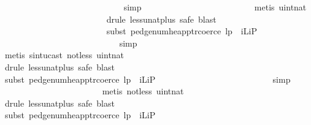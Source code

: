 \begin{isabellebody}
\ \ \ \ \ \ \ \ \ \ \ \ \ \ \ \ \ \ \ \ \ \ \ \ \ \ \ \isamarkupfalse%
\ simp{\isacharplus}\isanewline
\ \ \ \ \ \ \ \ \ \ \ \ \ \ \ \ \ \ \ \ \ \ \ \ \isamarkupfalse%
\ {\isacharparenleft}metis\ uint{\isacharunderscore}nat{\isacharparenright}\isanewline
\ \ \ \ \ \ \ \ \ \ \ \ \ \ \ \ \ \ \ \ \ \ \ \isamarkupfalse%
\ {\isacharparenleft}drule\ less{\isacharunderscore}unat{\isacharunderscore}plus{}{\isacharcomma}\ safe{\isacharcomma}\ blast{\isacharparenright}\isanewline
\ \ \ \ \ \ \ \ \ \ \ \ \ \ \ \ \ \ \ \ \ \ \ \isamarkupfalse%
\ {\isacharparenleft}subst\ pedge{\isacharunderscore}num{\isacharunderscore}heap{\isacharunderscore}ptr{\isacharunderscore}coerce{\isacharbrackleft}\ l{\isacharequal}p\ \ iL{\isacharequal}iP{\isacharbrackright}{\isacharparenright}\isanewline
\ \ \ \ \ \ \ \ \ \ \ \ \ \ \ \ \ \ \ \ \ \ \ \ \ \ \isamarkupfalse%
\ simp{\isacharplus}\isanewline
\ \ \ \ \ \ \ \ \ \ \ \ \ \ \ \ \ \ \ \ \ \ \ \isamarkupfalse%
\ {\isacharparenleft}metis\ sint{\isacharunderscore}ucast\ not{\isacharunderscore}less\ uint{\isacharunderscore}nat{\isacharparenright}\isanewline
\ \ \ \ \ \ \ \ \ \ \ \ \ \ \ \ \ \ \ \ \ \ \isamarkupfalse%
\ {\isacharparenleft}drule\ less{\isacharunderscore}unat{\isacharunderscore}plus{}{\isacharcomma}\ safe{\isacharcomma}\ blast{\isacharparenright}\isanewline
\ \ \ \ \ \ \ \ \ \ \ \ \ \ \ \ \ \ \ \ \ \ \isamarkupfalse%
\ {\isacharparenleft}subst\ pedge{\isacharunderscore}num{\isacharunderscore}heap{\isacharunderscore}ptr{\isacharunderscore}coerce{\isacharbrackleft}\ l{\isacharequal}p\ \ iL{\isacharequal}iP{\isacharbrackright}{\isacharparenright}\isanewline
\ \ \ \ \ \ \ \ \ \ \ \ \ \ \ \ \ \ \ \ \ \ \ \ \ \isamarkupfalse%
\ simp{\isacharplus}\isanewline
\ \ \ \ \ \ \ \ \ \ \ \ \ \ \ \ \ \ \ \ \ \ \isamarkupfalse%
\ {\isacharparenleft}metis\ not{\isacharunderscore}less\ uint{\isacharunderscore}nat{\isacharparenright}\isanewline
\ \ \ \ \ \ \ \ \ \ \ \ \ \ \ \ \ \ \ \ \ \isamarkupfalse%
\ {\isacharparenleft}drule\ less{\isacharunderscore}unat{\isacharunderscore}plus{}{\isacharcomma}\ safe{\isacharcomma}\ blast{\isacharparenright}\isanewline
\ \ \ \ \ \ \ \ \ \ \ \ \ \ \ \ \ \ \ \ \ \isamarkupfalse%
\ {\isacharparenleft}subst\ pedge{\isacharunderscore}num{\isacharunderscore}heap{\isacharunderscore}ptr{\isacharunderscore}coerce{\isacharbrackleft}\ l{\isacharequal}p\ \ iL{\isacharequal}iP{\isacharbrackright}{\isacharparenright}\isanewline

\end{isabellebody}
